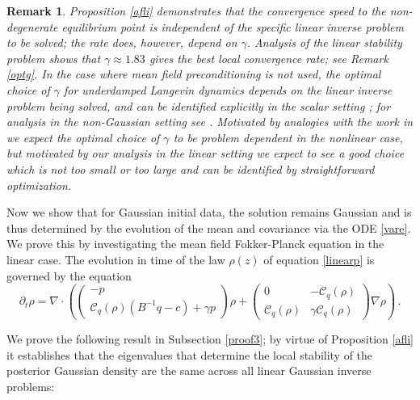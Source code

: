 \documentclass[12pt]{caltech_thesis}
\newtheorem{remark}[theorem]{Remark}
\numberwithin{equation}{section}
\begin{document}
\begin{remark}
\label{r:5.2}
{Proposition \ref{afli} demonstrates that the convergence speed to the
non-degenerate equilibrium point is independent of the specific linear
inverse problem to be solved; the rate does, however, depend on $\gamma$.
Analysis of the linear stability problem shows that $\gamma\approx1.83$ gives the best local convergence rate; see Remark \ref{optg}. In the case where mean field 
preconditioning is not used, the optimal choice of $\gamma$ for underdamped
Langevin dynamics depends on the linear inverse problem being solved, 
and can be identified explicitly in the scalar setting \cite{pavliotis2014stochastic}; for analysis in the non-Gaussian setting see \cite{chak2021optimal}. Motivated by analogies with the work in
\cite{pavliotis2014stochastic,chak2021optimal} we expect the optimal choice
of $\gamma$ to be problem dependent in the nonlinear case, but motivated
by our analysis in the linear setting we expect to see a good choice
which is not too small or too large and can be identified by straightforward
optimization.}
\end{remark}
\vspace{0.1in}

Now we show that for Gaussian initial data, the solution remains Gaussian and is thus determined by the evolution of the mean and covariance via the ODE \eqref{vare}.
We prove this by investigating the mean field Fokker-Planck equation in the linear case. 
The evolution in time of the law $\rho(z)$ of equation \eqref{linearp} is governed
by the equation
\begin{equation}
\label{linearfp}
\partial_t \rho=\nabla\cdot\left(
\begin{pmatrix}
-p \\
\mathcal{C}_q(\rho)(B^{-1}q-c) + {\gamma}p
\end{pmatrix}\rho+\begin{pmatrix}
0 & -\mathcal{C}_q(\rho) \\
\mathcal{C}_q(\rho) & {\gamma}\mathcal{C}_q(\rho)
\end{pmatrix}\nabla\rho\right)\,.
\end{equation}

{We prove the following result in Subsection \ref{proof3}; by
virtue of Proposition \ref{afli} it establishes
that the eigenvalues that determine the
local stability of the posterior Gaussian density are
the same across all linear Gaussian inverse problems:} 

\vspace{0.1in}
\end{document}
